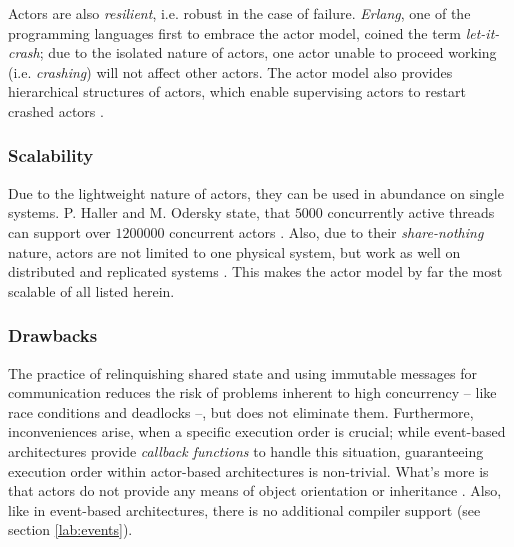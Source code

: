 Actors are also \textit{resilient}, i.e. robust in the case of failure. \textit{Erlang}, one of the programming languages first to embrace the actor model, coined the term \textit{let-it-crash}; due to the isolated nature of actors, one actor unable to proceed working (i.e. \textit{crashing}) will not affect other actors. The actor model also provides hierarchical structures of actors, which enable supervising actors to restart crashed actors \cite{Armstrong2007}.

\subsubsection*{Scalability}
Due to the lightweight nature of actors, they can be used in abundance on single systems. P. Haller and M. Odersky state, that $5000$ concurrently active threads can support over $1200000$ concurrent actors \cite[p. 2]{Haller2009}. Also, due to their \textit{share-nothing} nature, actors are not limited to one physical system, but work as well on distributed and replicated systems \cite[p. 233]{Gupta2012}. This makes the actor model by far the most scalable of all listed herein. 

\subsubsection*{Drawbacks}
The practice of relinquishing shared state and using immutable messages for communication reduces the risk of problems inherent to high concurrency -- like race conditions and deadlocks --, but does not eliminate them. Furthermore, inconveniences arise, when a specific execution order is crucial; while event-based architectures provide \textit{callback functions} to handle this situation, guaranteeing execution order within actor-based architectures is non-trivial. What's more is that actors do not provide any means of object orientation or inheritance \cite{Mackay97}. Also, like in event-based architectures, there is no additional compiler support (see section \ref{lab:events}).

